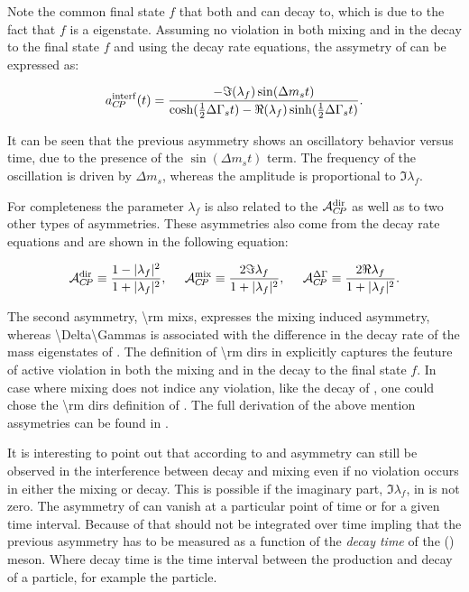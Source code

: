 \noindent Note the common final state $f$ that both \Bs and \Bsb can decay to, which is due to the fact
that $f$ is a \CP eigenstate. Assuming no \CP violation in both \BBbarSyst mixing and in the decay to the
final state $f$ and using the \BBbarSyst decay rate equations, the assymetry of 
can be expressed as:

\newcommand{\half}{\frac{1}{2}}
\begin{equation}
  \centering
  a_{\CP}^{\rm interf}(t) = \frac{ - \Im(\lambda_f) \sin(\Delta m_s t)} {\cosh(\half \Delta\Gamma_s t) - \Re(\lambda_f)\sinh(\half\Delta\Gamma_s t)}.
\label{cpv_interf}
\end{equation}

\noindent It can be seen that the previous asymmetry shows an oscillatory behavior versus time, due
to the presence of the $\sin(\Delta m_s t)$ term. The frequency of the oscillation is driven by $\Delta m_s$,
whereas the amplitude is proportional to $\Im\lambda_f$.

For completeness the parameter $\lambda_f$ is also related to the $\mathcal{A}_{C\!P}^{\rm dir}$ as well as to two other
types of asymmetries. These asymmetries also come from the \BBbarSyst decay rate equations and are shown
in the following equation:

\begin{equation}
  \centering
  \Acp{\rm dir}      \equiv \frac{ 1-|\lambda_f|^2} {1 + |\lambda_f|^2},\;\;\;\;\;
  \Acp{\rm mix}      \equiv \frac{ 2 \Im\lambda_f} {1 + |\lambda_f|^2},\;\;\;\;\;
  \Acp{\Delta\Gamma} \equiv \frac{ 2 \Re\lambda_f} {1 + |\lambda_f|^2}.
\label{cp_asym_lambda}
\end{equation}

\noindent The second asymmetry, \Acp{\rm mix}, expresses the mixing induced \CP asymmetry, whereas
\Acp{\Delta\Gamma} is associated with the difference in the decay rate of the mass eigenstates of
. The definition of \Acp{\rm dir} in  explicitly captures
the feuture of active \CP violation in both the \BBbarSyst mixing and in the decay to the final
state $f$. In case where mixing does not indice any \CP violation, like the decay of \BsJpsiKst,
one could chose the \Acp{\rm dir} definition of . The full derivation of the
above mention assymetries can be found in \cite{DeBruyn-thesis,jeroenThesis}.

It is interesting to point out that according to  and  \CP asymmetry
can still be observed in the interference between decay and
mixing even if no \CP violation occurs in either the mixing or decay. This is possible if the imaginary part,
$\Im\lambda_f$, in  is not zero. The asymmetry of  can vanish at a
particular point of time or for a given time interval. Because of that  should not
be integrated over time impling that the previous asymmetry has to be measured as a function of
the {\it decay time} of the \Bs (\Bsb) meson. Where decay time is the time interval between
the production and decay of a particle, for example the \Bs particle.

